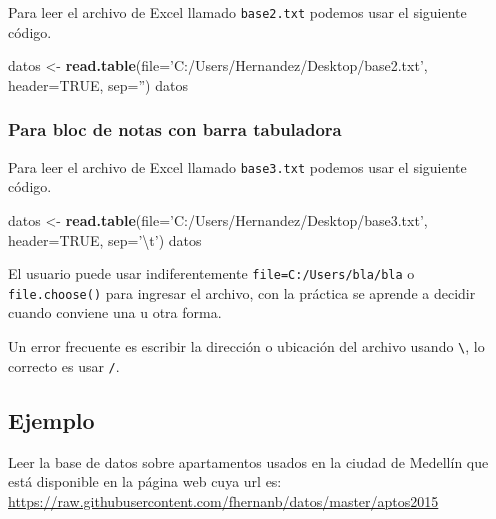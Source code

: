 \documentclass[10pt,]{krantz}
\makeatletter
\newenvironment{Shaded}{\begin{snugshade}}{\end{snugshade}}
\newcommand{\KeywordTok}[1]{\textcolor[rgb]{0.13,0.29,0.53}{\textbf{{#1}}}}
\newcommand{\DataTypeTok}[1]{\textcolor[rgb]{0.13,0.29,0.53}{{#1}}}
\newcommand{\CharTok}[1]{\textcolor[rgb]{0.31,0.60,0.02}{{#1}}}
\newcommand{\StringTok}[1]{\textcolor[rgb]{0.31,0.60,0.02}{{#1}}}
\newcommand{\OtherTok}[1]{\textcolor[rgb]{0.56,0.35,0.01}{{#1}}}
\newcommand{\NormalTok}[1]{{#1}}
\newenvironment{kframe}{%
\medskip{}
\setlength{\fboxsep}{.8em}
 \def\at@end@of@kframe{}%
 \ifinner\ifhmode%
  \def\at@end@of@kframe{\end{minipage}}%
  \begin{minipage}{\columnwidth}%
 \fi\fi%
 \def\FrameCommand##1{\hskip\@totalleftmargin \hskip-\fboxsep
 \colorbox{shadecolor}{##1}\hskip-\fboxsep
     \hskip-\linewidth \hskip-\@totalleftmargin \hskip\columnwidth}%
 \MakeFramed {\advance\hsize-\width
   \@totalleftmargin\z@ \linewidth\hsize
   \@setminipage}}%
 {\par\unskip\endMakeFramed%
 \at@end@of@kframe}
\renewenvironment{Shaded}{\begin{kframe}}{\end{kframe}}
\let\BeginKnitrBlock\begin \let\EndKnitrBlock\end
\makeatother
\begin{document}
Para leer el archivo de Excel llamado \texttt{base2.txt} podemos usar el
siguiente código.

\begin{Shaded}
\begin{Highlighting}[]
\NormalTok{datos <-}\StringTok{ }\KeywordTok{read.table}\NormalTok{(}\DataTypeTok{file=}\StringTok{'C:/Users/Hernandez/Desktop/base2.txt'}\NormalTok{,}
                    \DataTypeTok{header=}\OtherTok{TRUE}\NormalTok{, }\DataTypeTok{sep=}\StringTok{''}\NormalTok{)}
\NormalTok{datos}
\end{Highlighting}
\end{Shaded}

\subsubsection*{Para bloc de notas con barra
tabuladora}\label{para-bloc-de-notas-con-barra-tabuladora}

Para leer el archivo de Excel llamado \texttt{base3.txt} podemos usar el
siguiente código.

\begin{Shaded}
\begin{Highlighting}[]
\NormalTok{datos <-}\StringTok{ }\KeywordTok{read.table}\NormalTok{(}\DataTypeTok{file=}\StringTok{'C:/Users/Hernandez/Desktop/base3.txt'}\NormalTok{,}
                    \DataTypeTok{header=}\OtherTok{TRUE}\NormalTok{, }\DataTypeTok{sep=}\StringTok{'}\CharTok{\textbackslash{}t}\StringTok{'}\NormalTok{)}
\NormalTok{datos}
\end{Highlighting}
\end{Shaded}

\BeginKnitrBlock{rmdnote}
El usuario puede usar indiferentemente
\texttt{file=\textquotesingle{}C:/Users/bla/bla\textquotesingle{}} o
\texttt{file.choose()} para ingresar el archivo, con la práctica se
aprende a decidir cuando conviene una u otra forma.
\EndKnitrBlock{rmdnote}

\BeginKnitrBlock{rmdwarning}
Un error frecuente es escribir la dirección o ubicación del archivo
usando \texttt{\textbackslash{}}, lo correcto es usar \texttt{/}.
\EndKnitrBlock{rmdwarning}

\subsection*{Ejemplo}\label{ejemplo-25}


Leer la base de datos sobre apartamentos usados en la ciudad de Medellín
que está disponible en la página web cuya url es:
\url{https://raw.githubusercontent.com/fhernanb/datos/master/aptos2015}
\end{document}
